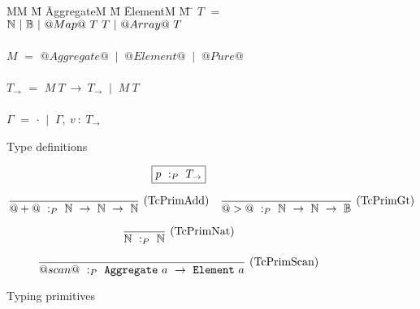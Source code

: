 
\begin{figure}

\begin{tabbing}
MM \= M \= AggregateM \= M \= ElementM \= M \= \kill
$T$
    \> $=$  \> $\mathbb{N}~|~\mathbb{B}~|~@Map@~T~T~|~@Array@~T$ \\
\\
$M$
    \> $=$  \> $@Aggregate@$
    \> $~|~$ \> $@Element@$
    \> $~|~$ \> $@Pure@$         \\
\\
$T_{\to}$
    \> $=$  
            \> $M~T~\to~T_{\to}$
            \> $~|~$
            \> $M~T$ \\
\\
$\Gamma$
    \> $=$  
            \> $\cdot$
            \> $~|~$
            \> $\Gamma,~v~:~T_\to$ \\
\end{tabbing}

\caption{Type definitions}
\label{fig:source:type:defs}
\end{figure}


\begin{figure}

$$
\boxed{p ~:_{P}~ T_\to}
$$


$$
\frac {\displaystyle 
} {\displaystyle  
    @+@ ~:_{P}~ \mathbb{N}~\to~\mathbb{N}~\to~\mathbb{N}
} \ 
\textrm{(TcPrimAdd)}
\quad
\frac {\displaystyle 
} {\displaystyle 
    @>@ ~:_{P}~ \mathbb{N}~\to~\mathbb{N}~\to~\mathbb{B}
} \ 
\textrm{(TcPrimGt)}
$$

$$
\frac {\displaystyle 
} {\displaystyle  
    \mathbb{N} ~:_{P}~ \mathbb{N}
} \ 
\textrm{(TcPrimNat)}
$$

$$
\frac {\displaystyle 
} {\displaystyle  
    @scan@ ~:_{P}~ \mathtt{Aggregate}~a~\to~\mathtt{Element}~a
} \ 
\textrm{(TcPrimScan)}
$$

\caption{Typing primitives}
\label{fig:source:type:prim}
\end{figure}


